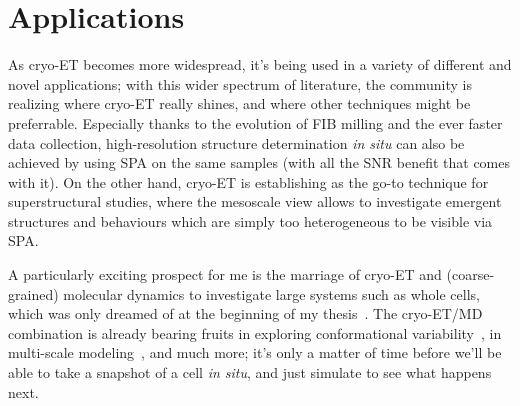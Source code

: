 \section{Applications}

As cryo-ET becomes more widespread, it's being used in a variety of different and novel applications; with this wider spectrum of literature, the community is realizing where cryo-ET really shines, and where other techniques might be preferrable.
Especially thanks to the evolution of FIB milling and the ever faster data collection, high-resolution structure determination \textit{in situ} can also be achieved by using SPA on the same samples (with all the SNR benefit that comes with it).
On the other hand, cryo-ET is establishing as the go-to technique for superstructural studies, where the mesoscale view allows to investigate emergent structures and behaviours which are simply too heterogeneous to be visible via SPA.

A particularly exciting prospect for me is the marriage of cryo-ET and (coarse-grained) molecular dynamics to investigate large systems such as whole cells, which was only dreamed of at the beginning of my thesis~\cite{earnestChallengesIntegratingStochastic2017}.
The cryo-ET/MD combination is already bearing fruits in exploring conformational variability~\cite{vuillemotMDTOMOMethodContinuous2023}, in multi-scale modeling~\cite{liDevelopmentMultiscaleUltracoarsegrained2023}, and much more; it's only a matter of time before we'll be able to take a snapshot of a cell \textit{in situ}, and just simulate to see what happens next.
